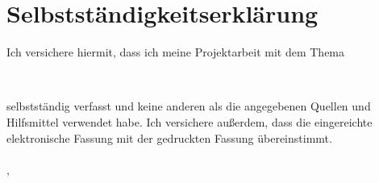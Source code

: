 
\newpage
\section*{Selbstständigkeitserklärung}
Ich versichere hiermit, dass ich meine Projektarbeit mit dem Thema
\begin{center}
\textbf{{\large \mytitle} \\ \mysubtitle}
\end{center}
selbstständig verfasst und keine anderen als die angegebenen Quellen und Hilfsmittel verwendet habe. Ich versichere außerdem, dass die eingereichte elektronische Fassung mit der gedruckten Fassung übereinstimmt.\\
\\
\vspace{15mm}
\noindent{}\mysubmissionplace , \mydate
\hfill
\begin{minipage}[t]{6cm}
\centering \dotfill \\
\myauthor
\end{minipage}